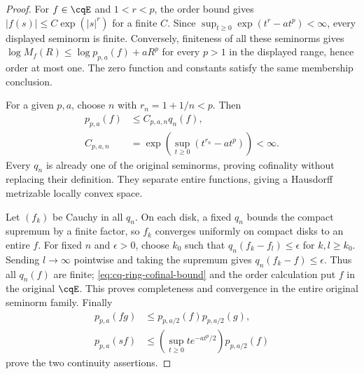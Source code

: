\begin{proof}
For $f\in\cqE$ and $1<r<p$, the order bound gives
$|f(s)|\leq C\exp(|s|^r)$ for a finite $C$.
Since $\sup_{t\geq0}\exp(t^r-at^p)<\infty$, every displayed
seminorm is finite. Conversely, finiteness of all these
seminorms gives
$\log M_f(R)\leq\log p_{p,a}(f)+aR^p$ for every $p>1$
in the displayed range, hence order at most one. The zero
function and constants satisfy the same membership conclusion.

For a given $p,a$, choose $n$ with $r_n=1+1/n<p$. Then
\begin{equation}
 \begin{aligned}
 p_{p,a}(f)&\leq C_{p,a,n}q_n(f),\\
 C_{p,a,n}&=\exp\left(\sup_{t\geq0}(t^{r_n}-at^p)\right)<\infty.
 \end{aligned}
 \label{eq:cq-ring-cofinal-bound}
\end{equation}
Every $q_n$ is already one of the original seminorms, proving
cofinality without replacing their definition. They separate
entire functions, giving a Hausdorff metrizable locally convex
space.

Let $(f_k)$ be Cauchy in all $q_n$. On each disk, a fixed
$q_n$ bounds the compact supremum by a finite factor, so
$f_k$ converges uniformly on compact disks to an entire $f$.
For fixed $n$ and $\epsilon>0$, choose $k_0$ such that
$q_n(f_k-f_l)\leq\epsilon$ for $k,l\geq k_0$.
Sending $l\to\infty$ pointwise and taking the supremum gives
$q_n(f_k-f)\leq\epsilon$. Thus all $q_n(f)$ are finite;
\eqref{eq:cq-ring-cofinal-bound} and the order calculation
put $f$ in the original $\cqE$. This proves completeness
and convergence in the entire original seminorm family.
Finally
\[
 \begin{aligned}
 p_{p,a}(fg)&\leq p_{p,a/2}(f)p_{p,a/2}(g),\\
 p_{p,a}(sf)&\leq
 \left(\sup_{t\geq0}t e^{-at^p/2}\right)p_{p,a/2}(f)
 \end{aligned}
\]
prove the two continuity assertions.
\end{proof}

